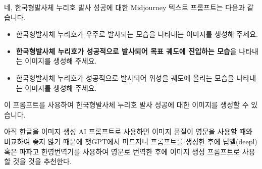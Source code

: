 \documentclass[
  letterpaper,
]{book}
\providecommand{\tightlist}{%
  \setlength{\itemsep}{0pt}\setlength{\parskip}{0pt}}\usepackage{longtable,booktabs,array}
\begin{document}
\begin{tcolorbox}
네, 한국형발사체 누리호 발사 성공에 대한 Midjourney 텍스트 프롬프트는
다음과 같습니다.

\begin{itemize}
\tightlist
\item
  한국형발사체 누리호가 우주로 발사되는 모습을 나타내는 이미지를 생성해
  주세요.
\item
  \textbf{한국형발사체 누리호가 성공적으로 발사되어 목표 궤도에 진입하는
  모습}을 나타내는 이미지를 생성해 주세요.
\item
  한국형발사체 누리호가 성공적으로 발사되어 위성을 궤도에 올리는 모습을
  나타내는 이미지를 생성해 주세요.
\end{itemize}

이 프롬프트를 사용하여 한국형발사체 누리호 발사 성공에 대한 이미지를
생성할 수 있습니다.

\end{tcolorbox}

아직 한글을 이미지 생성 AI 프롬프트로 사용하면 이미지 품질이 영문을
사용할 때와 비교하여 좋지 않기 때문에 챗GPT에서 미드저니 프롬프트를
생성한 후에 딥엘(deepl) 혹은 파파고 한영번역기를 사용하여 영문로 번역한
후에 이미지 생성 프롬프트로 사용할 것을 것을 추천한다.
\end{document}
